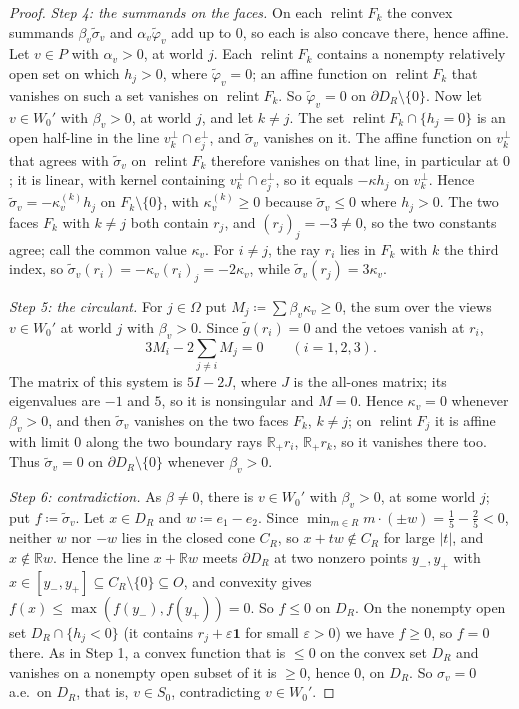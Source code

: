 \documentclass[11pt]{article}
\newcommand{\R}{\mathbb{R}}
\newcommand{\one}{\mathbf{1}}
\DeclareMathOperator{\relint}{relint}
\theoremstyle{plain}
\theoremstyle{definition}
\theoremstyle{remark}
\begin{document}
\begin{proof}
\emph{Step 4: the summands on the faces.} On each $\relint F_k$ the convex summands
$\beta_v\tilde\sigma_v$ and $\alpha_v\tilde\varphi_v$ add up to $0$, so each is also
concave there, hence affine. Let $v\in P$ with $\alpha_v>0$, at world $j$. Each $\relint
F_k$ contains a nonempty relatively open set on which $h_j>0$, where $\tilde\varphi_v=0$;
an affine function on $\relint F_k$ that vanishes on such a set vanishes on $\relint F_k$.
So $\tilde\varphi_v=0$ on $\partial D_R\setminus\{0\}$. Now let $v\in W_0'$ with
$\beta_v>0$, at world $j$, and let $k\ne j$. The set $\relint F_k\cap\{h_j=0\}$ is an open
half-line in the line $v_k^\perp\cap e_j^\perp$, and $\tilde\sigma_v$ vanishes on it. The
affine function on $v_k^\perp$ that agrees with $\tilde\sigma_v$ on $\relint F_k$
therefore vanishes on that line, in particular at $0$; it is linear, with kernel
containing $v_k^\perp\cap e_j^\perp$, so it equals $-\kappa h_j$ on $v_k^\perp$. Hence
$\tilde\sigma_v=-\kappa^{(k)}_vh_j$ on $F_k\setminus\{0\}$, with $\kappa^{(k)}_v\ge0$
because $\tilde\sigma_v\le0$ where $h_j>0$. The two faces $F_k$ with $k\ne j$ both contain
$r_j$, and $(r_j)_j=-3\ne0$, so the two constants agree; call the common value
$\kappa_v$. For $i\ne j$, the ray $r_i$ lies in $F_k$ with $k$ the third index, so
$\tilde\sigma_v(r_i)=-\kappa_v(r_i)_j=-2\kappa_v$, while $\tilde\sigma_v(r_j)=3\kappa_v$.

\emph{Step 5: the circulant.} For $j\in\Omega$ put $M_j\coloneqq\sum\beta_v\kappa_v\ge0$,
the sum over the views $v\in W_0'$ at world $j$ with $\beta_v>0$. Since $\tilde g(r_i)=0$ and the vetoes
vanish at $r_i$,
\[
  3M_i-2\sum_{j\ne i}M_j=0\qquad(i=1,2,3).
\]
The matrix of this system is $5I-2J$, where $J$ is the all-ones matrix; its eigenvalues are
$-1$ and $5$, so it is nonsingular and $M=0$. Hence $\kappa_v=0$ whenever $\beta_v>0$, and
then $\tilde\sigma_v$ vanishes on the two faces $F_k$, $k\ne j$; on $\relint F_j$ it is
affine with limit $0$ along the two boundary rays $\R_+r_i$, $\R_+r_k$, so it vanishes
there too. Thus $\tilde\sigma_v=0$ on $\partial D_R\setminus\{0\}$ whenever $\beta_v>0$.

\emph{Step 6: contradiction.} As $\beta\ne0$, there is $v\in W_0'$ with $\beta_v>0$, at
some world $j$; put $f\coloneqq\tilde\sigma_v$. Let $x\in D_R$ and $w\coloneqq e_1-e_2$.
Since $\min_{m\in R}m\cdot(\pm w)=\frac15-\frac25<0$, neither $w$ nor $-w$ lies in the
closed cone $C_R$, so $x+tw\notin C_R$ for large $|t|$, and $x\notin\R w$. Hence the line
$x+\R w$ meets $\partial D_R$ at two nonzero points $y_-,y_+$ with $x\in[y_-,y_+]
\subseteq C_R\setminus\{0\}\subseteq O$, and convexity gives $f(x)\le\max(f(y_-),f(y_+))
=0$. So $f\le0$ on $D_R$. On the nonempty open set $D_R\cap\{h_j<0\}$ (it contains
$r_j+\varepsilon\one$ for small $\varepsilon>0$) we have $f\ge0$, so $f=0$ there. As in
Step 1, a convex function that is $\le0$ on the convex set $D_R$ and vanishes on a nonempty
open subset of it is $\ge0$, hence $0$, on $D_R$. So $\sigma_v=0$ a.e.\ on $D_R$, that is,
$v\in S_0$, contradicting $v\in W_0'$.
\end{proof}
\end{document}
